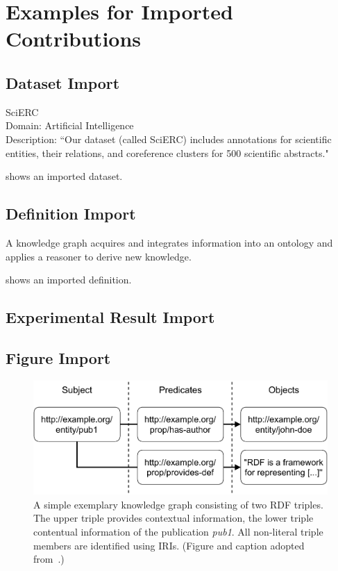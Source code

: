 
\section{Examples for Imported Contributions}

\subsection{Dataset Import}


\begin{dataset}
SciERC~\cite{DBLP:conf/emnlp/LuanHOH18}\\
Domain: Artificial Intelligence\\
Description: ``Our dataset (called SciERC) includes annotations for scientific entities, their relations, and coreference clusters for 500 scientific abstracts."~\cite{DBLP:conf/emnlp/LuanHOH18}
\label{dataset:scierc}
\end{dataset}

 shows an imported dataset.

\subsection{Definition Import}


\begin{definition}
\label{def:knowledge-graph}
A knowledge graph acquires and integrates information into an ontology and applies a reasoner to derive new knowledge.
\end{definition}

 shows an imported definition.

\subsection{Experimental Result Import}

\subsection{Figure Import}


\begin{figure}[htb!]
\centering
\includegraphics[max width=0.7\columnwidth]{./figures/triple_example}
\caption{A simple exemplary knowledge graph consisting of two RDF triples. The upper triple provides contextual information, the lower triple contentual information of the publication \emph{{pub1}}. All non-literal triple members are identified using IRIs. (Figure and caption adopted from~\cite{Martin21}.)}
\label{fig:contentual-contextual}
\end{figure}

